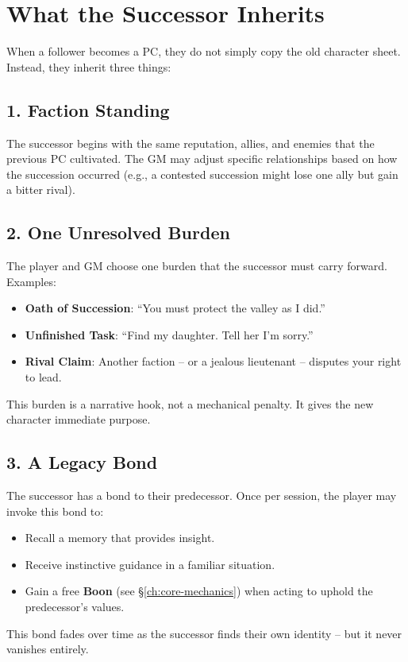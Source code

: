 \section{What the Successor Inherits}
\label{sec:inheritance}

When a follower becomes a PC, they do not simply copy the old character sheet. Instead, they inherit three things:

\subsection{1. Faction Standing}
\label{subsec:inherit-standing}

The successor begins with the same reputation, allies, and enemies that the previous PC cultivated. The GM may adjust specific relationships based on how the succession occurred (e.g., a contested succession might lose one ally but gain a bitter rival).

\subsection{2. One Unresolved Burden}
\label{subsec:inherit-burden}

The player and GM choose one burden that the successor must carry forward. Examples:
\begin{itemize}
  \item \textbf{Oath of Succession}: “You must protect the valley as I did.”
  \item \textbf{Unfinished Task}: “Find my daughter. Tell her I’m sorry.”
  \item \textbf{Rival Claim}: Another faction – or a jealous lieutenant – disputes your right to lead.
\end{itemize}
This burden is a narrative hook, not a mechanical penalty. It gives the new character immediate purpose.

\subsection{3. A Legacy Bond}
\label{subsec:inherit-bond}

The successor has a bond to their predecessor. Once per session, the player may invoke this bond to:
\begin{itemize}
  \item Recall a memory that provides insight.
  \item Receive instinctive guidance in a familiar situation.
  \item Gain a free \textbf{Boon} (see \S\ref{ch:core-mechanics}) when acting to uphold the predecessor’s values.
\end{itemize}
This bond fades over time as the successor finds their own identity – but it never vanishes entirely.

